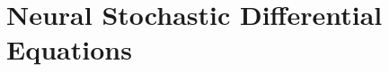 \chapter{Neural Stochastic Differential Equations}
\label{chapter:neural_stochastic_differential_equations}